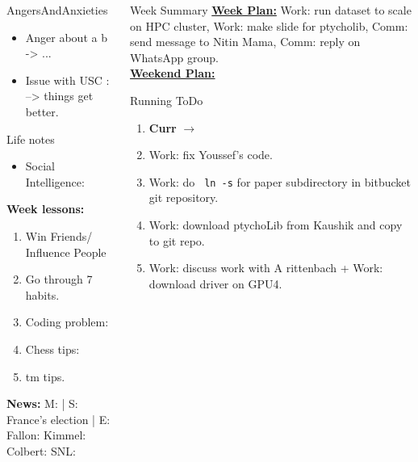 \begin{columns}
\begin{column}{0.333\columnwidth}
\begin{columns}
\begin{column}{0.20\linewidth}
\begin{block}{AngersAndAnxieties}
\begin{itemize}
        \item \tiny Anger about a b  -> ...
        \item \tiny Issue with USC : --> things get better. 
        \end{itemize}
      \end{block}
      \begin{block}{Life notes}
        \begin{itemize}
          \tiny \item \tiny Social Intelligence: 
        \end{itemize}
      \end{block}

      \begin{block}
        {\tiny {\bf Week lessons:}}
        \begin{enumerate}
          \tiny \item \tiny Win Friends/ Influence People
        \item \tiny Go through 7 habits.
        \item \tiny Coding problem: 
        \item \tiny Chess tips: 
        \item \tiny tm tips.
        \end{enumerate}
            {{\tiny {\tiny \bf  News:}} {\tiny  M: | S: France's election | E:
              Fallon:   Kimmel:  Colbert: SNL:}}
      \end{block}
    \end{column}
  \begin{column}{0.6\linewidth}
    \begin{block}{Week Summary} 
      {\underline {\bf Week Plan:}
        Work: run dataset to scale on HPC cluster, Work: make slide
        for ptycholib, Comm: send message to Nitin Mama, Comm: reply
        on  WhatsApp group. } \\

      {\underline{\bf Weekend Plan:} }\\
    \end{block}

      \begin{block}{Running ToDo} %
        \begin{enumerate} 
          \item \tiny \textbf{Curr} $\rightarrow$
          \item \tiny Work: fix Youssef's code.
          \item \tiny Work: do \texttt{ ln -s} for paper subdirectory
            in bitbucket git repository.
          \item \tiny Work: download ptychoLib from Kaushik and copy
            to git repo.
          \item \tiny Work: discuss work with A rittenbach + Work: download driver on GPU4. 
           

\end{enumerate}
\end{block}
\end{column}
\end{columns}
\end{column}
\end{columns}
